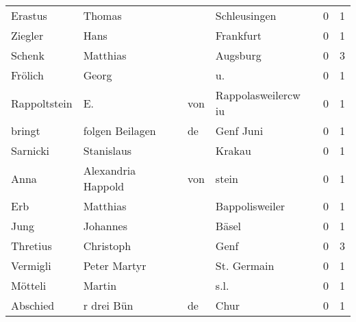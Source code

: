 \begin{center}
\begin{tiny}
\begin{longtabu}{llllrr}
                  Erastus &                             Thomas &             &                                Schleusingen &          0 &         1 \\
                  Ziegler &                               Hans &             &                                   Frankfurt &          0 &         1 \\
                   Schenk &                           Matthias &             &                                    Augsburg &          0 &         3 \\
                  Frölich &                              Georg &             &                                         u.  &          0 &         1 \\
             Rappoltstein &                                 E. &         von &                         Rappolasweilercw iu &          0 &         1 \\
                   bringt &                    folgen Beilagen &          de &                                   Genf Juni &          0 &         1 \\
                 Sarnicki &                         Stanislaus &             &                                      Krakau &          0 &         1 \\
                     Anna &                Alexandria  Happold &         von &                                       stein &          0 &         1 \\
                      Erb &                           Matthias &             &                              Bappolisweiler &          0 &         1 \\
                     Jung &                           Johannes &             &                                       Bäsel &          0 &         1 \\
                 Thretius &                          Christoph &             &                                        Genf &          0 &         3 \\
                 Vermigli &                       Peter Martyr &             &                                 St. Germain &          0 &         1 \\
                  Mötteli &                             Martin &             &                                        s.l. &          0 &         1 \\
                 Abschied &                         r drei Bün &          de &                                        Chur &          0 &         1 \\

\end{longtabu}
\end{tiny}
\end{center}
